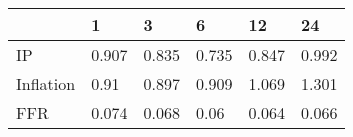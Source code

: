 \begin{tabular}{llllll}
\toprule 
& 1 & 3 & 6 & 12 & 24 \\ 
\midrule 
IP & 0.907 & 0.835 & 0.735 & 0.847 & 0.992 \\ 
Inflation & 0.91 & 0.897 & 0.909 & 1.069 & 1.301 \\ 
FFR & 0.074 & 0.068 & 0.06 & 0.064 & 0.066 \\ 
\bottomrule 
\end{tabular}